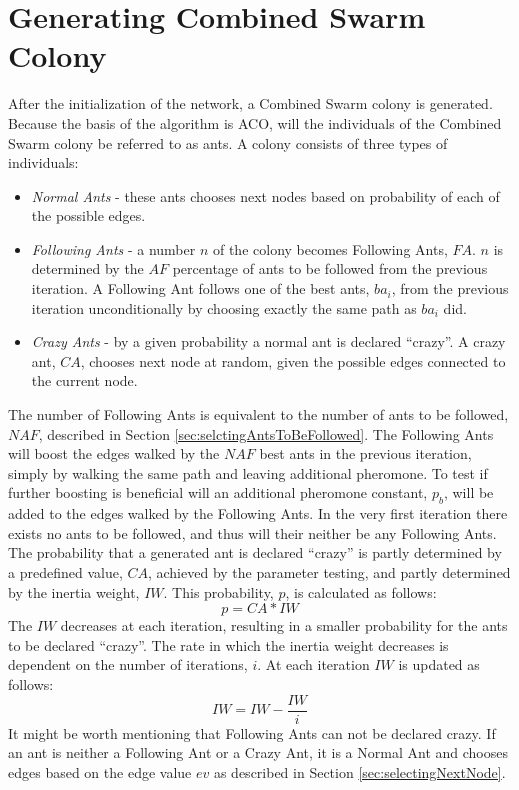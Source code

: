 \section{Generating Combined Swarm Colony}
\label{sec:algoGeneratingSuperSwarm}
After the initialization of the network, a Combined Swarm colony is generated. Because the basis of the algorithm is ACO, will the individuals of the Combined Swarm colony be referred to as ants. A colony consists of three types of individuals:
\begin{itemize}
\item \textit{Normal Ants} - these ants chooses next nodes based on probability of each of the possible edges. 
\item \textit{Following Ants} - a number $n$ of the colony becomes Following Ants, $FA$. $n$ is determined by the $AF$ percentage of ants to be followed from the previous iteration. A Following Ant follows one of the best ants, $ba_i$, from the previous iteration unconditionally by choosing exactly the same path as $ba_i$ did.
\item \textit{Crazy Ants} - by a given probability a normal ant is declared ``crazy''. A crazy ant, $CA$, chooses next node at random, given the possible edges connected to the current node.  
\end{itemize}
The number of Following Ants is equivalent to the number of ants to be followed, $NAF$, described in Section \vref{sec:selctingAntsToBeFollowed}. The Following Ants will boost the edges walked by the $NAF$ best ants in the previous iteration, simply by walking the same path and leaving additional pheromone. To test if further boosting is beneficial will an additional pheromone constant, $p_b$, will be added to the edges walked by the Following Ants. In the very first iteration there exists no ants to be followed, and thus will their neither be any Following Ants. 
\newline
\newline
The probability that a generated ant is declared ``crazy'' is partly determined by a predefined value, $CA$, achieved by the parameter testing, and partly determined by the inertia weight, $IW$. This probability, $p$, is calculated as follows:
$$p = CA*IW$$
The $IW$ decreases at each iteration, resulting in a smaller probability for the ants to be declared ``crazy''. The rate in which the inertia weight decreases is dependent on the number of iterations, $i$. At each iteration $IW$ is updated as follows:
$$IW = IW - \frac{IW}{i}$$
It might be worth mentioning that Following Ants can not be declared crazy. 
\newline
\newline
If an ant is neither a Following Ant or a Crazy Ant, it is a Normal Ant and chooses edges based on the edge value $ev$ as described in Section \vref{sec:selectingNextNode}.
